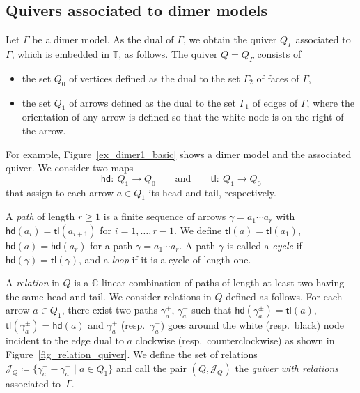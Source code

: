 \documentclass[10pt,a4paper]{amsart}
\numberwithin{equation}{section}
\theoremstyle{definition}
\newcommand{\CC}{\mathbb{C}}
\newcommand{\TT}{\mathbb{T}}
\newcommand{\calJ}{\mathcal{J}}
\newcommand{\hd}{\mathsf{hd}}
\newcommand{\tl}{\mathsf{tl}}
\begin{document}
\subsection{Quivers associated to dimer models}\label{subsec_quiver}

Let $\Gamma$ be a dimer model.
As the dual of $\Gamma$, we obtain the quiver $Q_\Gamma$ associated to $\Gamma$, which is embedded in $\TT$, as follows.
The quiver $Q=Q_\Gamma$ consists of
\begin{itemize}\itemsep=0pt
\item the set $Q_0$ of vertices defined as the dual to the set $\Gamma_2$ of faces of $\Gamma$,
\item the set $Q_1$ of arrows defined as the dual to the set $\Gamma_1$ of edges of $\Gamma$, where the orientation of any arrow is defined so that the white node is on the right of the arrow.
\end{itemize}
For example, Figure~\ref{ex_dimer1_basic} shows a dimer model and the associated quiver.
We consider two maps
\[
\hd \colon \ Q_1\to Q_0 \qquad \text{and}\qquad \tl \colon \ Q_1\to Q_0
\]
that assign to each arrow $a\in Q_1$ its head and tail, respectively.

A \emph{path} of length $r\ge 1$ is a finite sequence of arrows $\gamma=a_1\cdots a_r$ with $\hd(a_i)=\tl(a_{i+1})$ for $i=1, \dots, r-1$.
We define $\tl(a)=\tl(a_1)$, $\hd(a)=\hd(a_r)$ for a path $\gamma=a_1\cdots a_r$.
A path $\gamma$ is called a \emph{cycle} if $\hd(\gamma)=\tl(\gamma)$, and a \emph{loop} if it is a cycle of length one.

A \emph{relation} in $Q$ is a $\CC$-linear combination of paths of length at least two having the same head and tail.
We consider relations in $Q$ defined as follows.
For each arrow $a\in Q_1$, there exist two paths $\gamma_a^+$, $\gamma_a^-$ such that $\hd(\gamma_a^\pm)=\tl(a)$, $\tl(\gamma_a^\pm)=\hd(a)$ and
$\gamma_a^+$ (resp.\ $\gamma_a^-$) goes around the white (resp.\ black) node incident to the edge dual to $a$ clockwise (resp.\ counterclockwise) as shown in Figure~\ref{fig_relation_quiver}.
We define the set of relations $\calJ_Q\coloneqq \{\gamma_a^+-\gamma_a^- \mid a\in Q_1\}$ and
call the pair $(Q,\calJ_Q)$ the \emph{quiver with relations} associated to~$\Gamma$.
\end{document}
